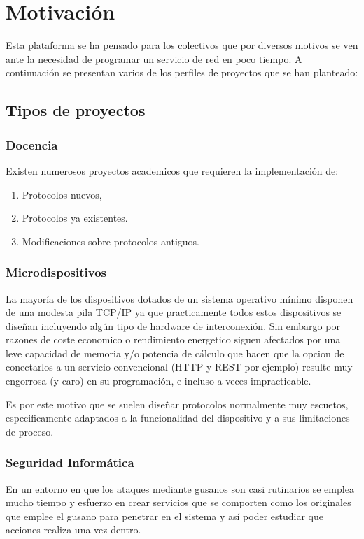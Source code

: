 \documentclass[a4paper,spanish,12pt]{book}
\begin{document}
\chapter{Motivación}
Esta plataforma se ha pensado para los colectivos que por diversos motivos se ven ante la necesidad de programar un servicio de red en poco tiempo. A continuaci\'on se presentan varios de los perfiles de proyectos que se han planteado:
\section{Tipos de proyectos}
\subsection{Docencia}
Existen numerosos proyectos academicos que requieren la implementaci\'on de:
\begin{enumerate}
\item Protocolos nuevos,
\item Protocolos ya existentes.
\item Modificaciones sobre protocolos antiguos. 
\end{enumerate}

\subsection{Microdispositivos}
La mayor\'ia de los dispositivos dotados de un sistema operativo m\'inimo disponen de una modesta pila TCP/IP ya que practicamente todos estos dispositivos se dise\~{n}an incluyendo algún tipo de hardware de interconexi\'on. Sin embargo por razones de coste economico o rendimiento energetico siguen afectados por una leve capacidad de memoria y/o potencia de c\'alculo que hacen que la opcion de conectarlos a un servicio convencional (HTTP y REST por ejemplo) resulte muy engorrosa (y caro) en su programaci\'on, e incluso a veces impracticable.

Es por este motivo que se suelen dise\~{n}ar protocolos normalmente muy escuetos, especificamente adaptados a la funcionalidad del dispositivo y a sus limitaciones de proceso.

\subsection{Seguridad Inform\'atica}
En un entorno en que los ataques mediante gusanos son casi rutinarios se emplea mucho tiempo y esfuerzo en crear servicios que se comporten como los originales que emplee el gusano para penetrar en el sistema y as\'i poder estudiar que acciones realiza una vez dentro.
\end{document}
